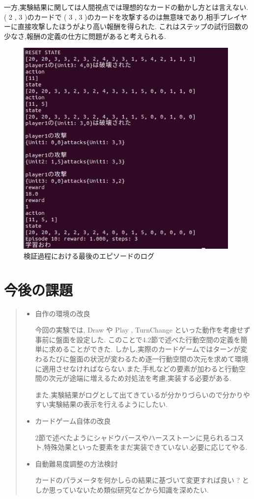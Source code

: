 \documentclass{jarticle}     %
\begin{document}
一方,実験結果に関しては人間視点では理想的なカードの動かし方とは言えない.
 ( 2 , 3 )のカードで ( 3 , 3 )のカードを攻撃するのは無意味であり,相手プレイヤーに直接攻撃したほうがより高い報酬を得られた.
これはステップの試行回数の少なさ,報酬の定義の仕方に問題があると考えられる.
\begin{figure}[htbp]
  \centering
  \includegraphics[width=110mm]{assets/Log.eps}
  \caption{検証過程における最後のエピソードのログ}
  \label{fig:Log}
\end{figure}

\section{今後の課題}


\begin{quote}
  \begin{itemize}
   \item 自作の環境の改良
   \par
    今回の実験では, Draw や Play , TurnChange といった動作を考慮せず事前に盤面を設定した.
    このことで4.2節で述べた行動空間の定義を簡単に求めることができた.
    しかし,実際のカードゲームではターンが変わるたびに盤面の状況が変わるため逐一行動空間の次元を求めて環境に適用させなければならない.また,手札などの要素が加わると行動空間の次元が途端に増えるため対処法を考慮,実装する必要がある.\par
    また,実験結果がログとして出てきているが分かりづらいので分かりやすい実験結果の表示を行えるようにしたい.
    \item カードゲーム自体の改良
    \par
    2節で述べたようにシャドウバースやハースストーンに見られるコスト,特殊効果といった要素をまだ実装できていない.必要に応じてやる.
    \item 自動難易度調整の方法検討
    \par
    カードのパラメータを何かしらの結果に基づいて変更すれば良い ? としか思っていないため類似研究などから知識を深めたい.

  \end{itemize}
 \end{quote}



\end{document}
